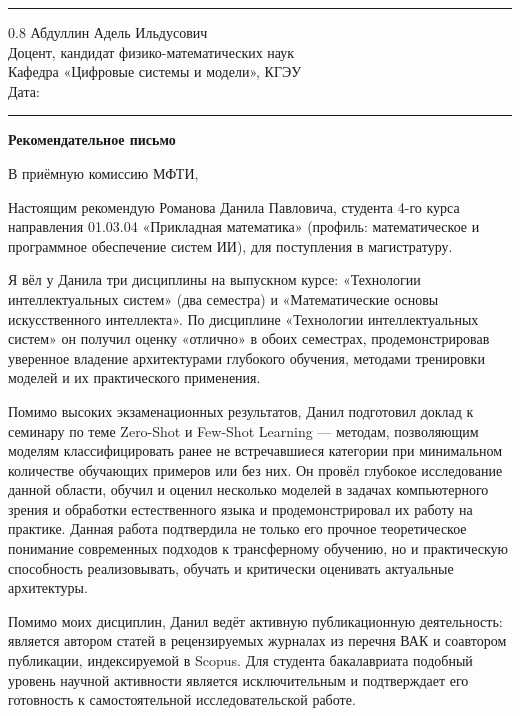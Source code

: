 \documentclass[a4paper,12pt]{article}
\begin{document}
\vspace{4pt}
\noindent\rule{\textwidth}{0.8pt}

\begin{flushright}
  \begin{spacing}{0.8}
    Абдуллин Адель Ильдусович\\
    Доцент, кандидат физико-математических наук\\
    Кафедра «Цифровые системы и модели», КГЭУ\\[6pt]
    Дата: \rule{4cm}{0.4pt}
  \end{spacing}
\end{flushright}

\begin{center}
  {\Large\bfseries Рекомендательное письмо}
\end{center}

В приёмную комиссию МФТИ,

Настоящим рекомендую Романова Данила Павловича, студента 4-го курса направления 01.03.04 «Прикладная математика» (профиль: ма\-те\-ма\-ти\-че\-ское и про\-грамм\-ное обес\-пе\-че\-ние систем ИИ), для по\-сту\-пле\-ния в ма\-ги\-стра\-ту\-ру.

Я вёл у Данила три дисциплины на выпускном курсе: «Технологии интеллектуальных систем» (два семестра) и «Математические основы искусственного интеллекта». По дисциплине «Технологии интеллектуальных систем» он получил оценку «отлично» в обоих семестрах, продемонстрировав уверенное владение архитектурами глубокого обучения, методами тренировки моделей и их практического применения.

Помимо высоких экзаменационных результатов, Данил подготовил доклад к семинару по теме Zero-Shot и Few-Shot Learning --- методам, позволяющим моделям классифицировать ранее не встречавшиеся категории при минимальном количестве обучающих примеров или без них. Он провёл глубокое исследование данной области, обучил и оценил несколько моделей в задачах компьютерного зрения и обработки естественного языка и продемонстрировал их работу на практике. Данная работа подтвердила не только его прочное теоретическое понимание современных подходов к трансферному обучению, но и практическую способность реализовывать, обучать и критически оценивать актуальные архитектуры.

Помимо моих дисциплин, Данил ведёт активную публикационную деятельность: является автором статей в рецензируемых журналах из перечня ВАК и соавтором публикации, индексируемой в Scopus. Для студента бакалавриата подобный уровень научной активности является исключительным и подтверждает его готовность к самостоятельной исследовательской работе.
\end{document}
